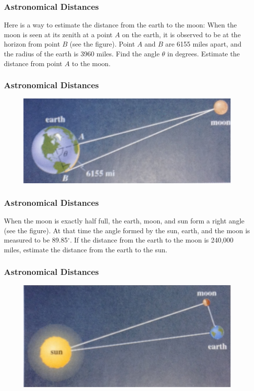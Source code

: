 \documentclass[xcolor=dvipsnames]{beamer}
\begin{document}
\begin{frame}
  \frametitle{Astronomical Distances}
  Here is a way to estimate the distance from the earth to the moon:
  When the moon is seen at its zenith at a point $A$ on the earth, it
  is observed to be at the horizon from point $B$ (see the figure).
  Point $A$ and $B$ are 6155 miles apart, and the radius of the earth
  is 3960 miles. Find the angle $\theta$ in degrees. Estimate the
  distance from point $A$ to the moon.
\end{frame}

\begin{frame}
  \frametitle{Astronomical Distances}
  \begin{figure}[h]
    \includegraphics[scale=.35]{./earthmoon.png}
  \end{figure}
\end{frame}

\begin{frame}
  \frametitle{Astronomical Distances}
  When the moon is exactly half full, the earth, moon, and sun form a
  right angle (see the figure). At that time the angle formed by the
  sun, earth, and the moon is measured to be 89.85$^{\circ}$. If the
  distance from the earth to the moon is 240,000 miles, estimate the
  distance from the earth to the sun.
\end{frame}

\begin{frame}
  \frametitle{Astronomical Distances}
  \begin{figure}[h]
    \includegraphics[scale=.35]{./earthsun.png}
  \end{figure}
\end{frame}
\end{document}
